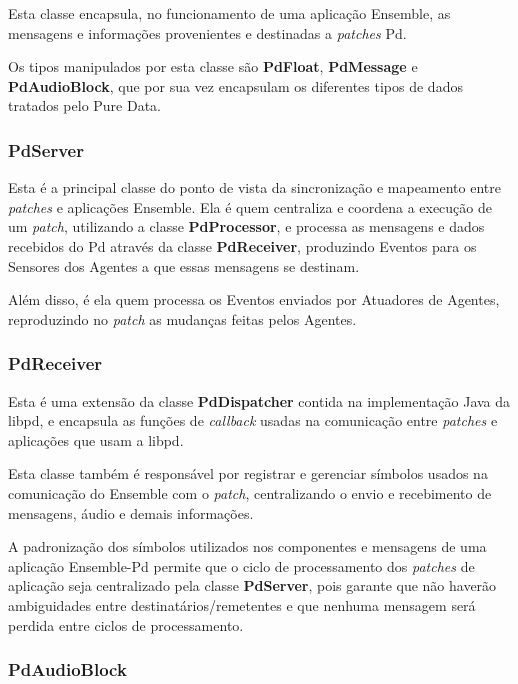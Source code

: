 \documentclass[a4paper, 11pt, twoside]{article}
\begin{document}
\begin{multicols}{2}
Esta classe encapsula, no funcionamento de uma aplicação Ensemble,
as mensagens e informações provenientes e destinadas a \textit{patches} Pd.

Os tipos manipulados por esta classe são \textbf{PdFloat}, \textbf{PdMessage} e
\textbf{PdAudioBlock}, que por sua vez encapsulam os diferentes tipos de dados
tratados pelo Pure Data.

\subsubsection{PdServer}

Esta é a principal classe do ponto de vista da sincronização 
e mapeamento entre \textit{patches} e aplicações Ensemble.
Ela é quem centraliza e coordena a execução de um \textit{patch}, utilizando
a classe \textbf{PdProcessor}, e processa as mensagens e dados recebidos do Pd 
através da classe \textbf{PdReceiver}, produzindo Eventos para os Sensores 
dos Agentes a que essas mensagens se destinam.

Além disso, é ela quem processa os Eventos enviados por Atuadores de Agentes,
reproduzindo no \textit{patch} as mudanças feitas pelos Agentes.

\subsubsection{PdReceiver}

Esta é uma extensão da classe \textbf{PdDispatcher} contida na implementação
Java da libpd, e encapsula as funções de \textit{callback} usadas na
comunicação entre \textit{patches} e aplicações que usam a libpd.

Esta classe também é responsável por registrar e gerenciar símbolos
usados na comunicação do Ensemble com o \textit{patch}, centralizando
o envio e recebimento de mensagens, áudio e demais informações.

A padronização dos símbolos utilizados nos componentes e mensagens
de uma aplicação Ensemble-Pd permite que o ciclo de processamento
dos \textit{patches} de aplicação seja centralizado pela classe
\textbf{PdServer}, pois garante que não haverão ambiguidades entre
destinatários/remetentes e que nenhuma mensagem será perdida
entre ciclos de processamento.

\subsubsection{PdAudioBlock}


\end{multicols}
\end{document}
